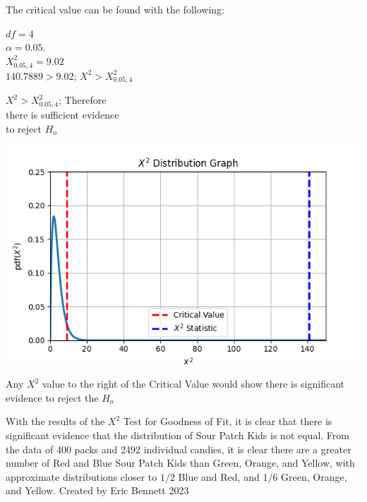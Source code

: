 \documentclass{article}
\begin{document}
	\begin{minipage}[t]{0.4\textwidth}
		\vspace{0.475cm}
		The critical value can be found with the following: \vspace{0.3cm}
		
		\hspace{0.4cm}
		\begin{minipage}{\dimexpr\linewidth-0.5cm}
    		$df=4$ \\
    		$\alpha = 0.05$. \\
    		$X^{2}_{0.05,4}=9.02$ \\
    		$140.7889>9.02$; $X^{2}>X^{2}_{0.05,4}$
		\end{minipage}
		
		\vspace{0.5cm}
		\begin{center}
			$X^{2}>X^{2}_{0.05,4}$; Therefore \\
			there is sufficient evidence \\
			to reject $H_o$
		\end{center}

	\end{minipage}
	\hfill
	\begin{minipage}[t]{0.5\textwidth}
		\vspace{0cm}
		\centering
    	\includegraphics[width=1 \textwidth]{chisquaregraph.png}

		Any $X^{2}$ value to the right of the Critical Value would show there is significant evidence to reject the $H_{o}$
	\end{minipage}

	\vspace{0.25cm}

	With the results of the $X^{2}$ Test for Goodness of Fit, it is clear that there is significant evidence that the distribution of Sour Patch Kids is not equal. From the data of 400 packs and 2492 individual candies, it is clear there are a greater number of Red and Blue Sour Patch Kids than Green, Orange, and Yellow, with approximate distributions closer to $1/2$ Blue and Red, and $1/6$ Green, Orange, and Yellow. Created by Eric Bennett 2023
\end{document}
